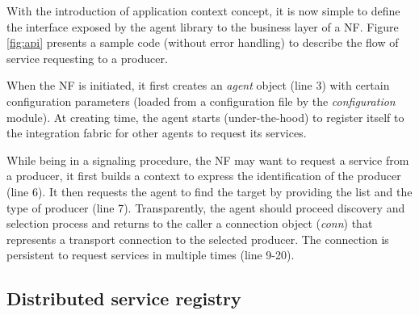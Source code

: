 \documentclass[conference]{IEEEtran}
\begin{document}
With the introduction of application context concept, it is now simple to
define the interface exposed by the agent library to the business layer of a
NF. Figure \ref{fig:api} presents a sample code (without error
handling) to describe the flow of service requesting to a producer.

When the NF is initiated, it first creates  an \textit{agent} object  (line 3)
with certain configuration parameters (loaded from a configuration file by the
\textit{configuration} module). At creating time, the agent starts
(under-the-hood) to register itself to the integration fabric for other agents
to request its services.

While being in a signaling procedure, the NF may want to request a service from
a producer, it first builds a context to express the identification of the
producer (line 6). It then requests the agent to find the target by providing
the list and the type of producer (line 7). Transparently, the agent should
proceed discovery and selection process and returns to the caller a connection
object (\textit{conn}) that represents a transport connection to the selected
producer. The connection is persistent to request services in multiple times
(line 9-20). 

\subsection{Distributed service registry}
\end{document}
